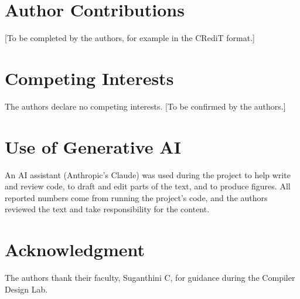\documentclass{ieeeaccess}
\begin{document}
\section*{Author Contributions}
[To be completed by the authors, for example in the CRediT format.]

\section*{Competing Interests}
The authors declare no competing interests. [To be confirmed by the authors.]

\section*{Use of Generative AI}
An AI assistant (Anthropic's Claude) was used during the project to help write and review code, to draft and edit parts of the text, and to produce figures. All reported numbers come from running the project's code, and the authors reviewed the text and take responsibility for the content.

\section*{Acknowledgment}
The authors thank their faculty, Suganthini C, for guidance during the Compiler Design Lab.
\end{document}
